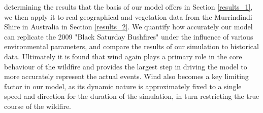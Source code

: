 determining the results that the basis of our model offers in Section \ref{results_1}, we then apply it to real geographical and vegetation data from the Murrindindi Shire in Australia in Section \ref{results_2}. We quantify how accurately our model can replicate the 2009 "Black Saturday Bushfires" under the influence of various environmental parameters, and compare the results of our simulation to historical data. Ultimately it is found that wind again plays a primary role in the core behaviour of the wildfire and provides the largest step in driving the model to more accurately represent the actual events. Wind also becomes a key limiting factor in our model, as its dynamic nature is approximately fixed to a single speed and direction for the duration of the simulation, in turn restricting the true course of the wildfire.